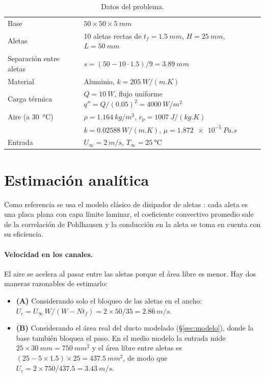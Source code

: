 \documentclass[11pt,letterpaper]{article}
\begin{document}
\begin{table}[H]
\centering
\caption{Datos del problema.}
\begin{tabular}{ll}\toprule
Base & $50\times50\times\SI{5}{mm}$\\
Aletas & 10 aletas rectas de $t_f=\SI{1.5}{mm}$, $H=\SI{25}{mm}$, $L=\SI{50}{mm}$\\
Separación entre aletas & $s=(50-10\cdot1.5)/9=\SI{3.89}{mm}$\\
Material & Aluminio, $k=\SI{205}{W/(m.K)}$\\
Carga térmica & $Q=\SI{10}{W}$, flujo uniforme $q''=Q/(0.05)^2=\SI{4000}{W/m^2}$\\
Aire (a \SI{30}{\celsius}) & $\rho=\SI{1.164}{kg/m^3}$, $c_p=\SI{1007}{J/(kg.K)}$\\ & $k=\SI{0.02588}{W/(m.K)}$, $\mu=\SI{1.872e-5}{Pa.s}$\\
Entrada & $U_\infty=\SI{2}{m/s}$, $T_\infty=\SI{25}{\celsius}$\\\bottomrule
\end{tabular}
\end{table}

\section{Estimación analítica}
\label{sec:analitica}
Como referencia se usa el modelo clásico de disipador de aletas \cite{incropera}: cada aleta es una placa plana con capa límite laminar, el coeficiente convectivo promedio sale de la correlación de Pohlhausen y la conducción en la aleta se toma en cuenta con su eficiencia.

\paragraph{Velocidad en los canales.} El aire se acelera al pasar entre las aletas porque el área libre es menor. Hay dos maneras razonables de estimarlo:
\begin{itemize}
\item \textbf{(A)} Considerando solo el bloqueo de las aletas en el ancho: $U_c=U_\infty\,W/(W-Nt_f)=2\times50/35=\SI{2.86}{m/s}$.
\item \textbf{(B)} Considerando el área real del ducto modelado (\S\ref{sec:modelo}), donde la base también bloquea el paso. En el medio modelo la entrada mide $25\times\SI{30}{mm}=\SI{750}{mm^2}$ y el área libre entre aletas es $(25-5\times1.5)\times25=\SI{437.5}{mm^2}$, de modo que $U_c=2\times750/437.5=\SI{3.43}{m/s}$.
\end{itemize}
\end{document}
